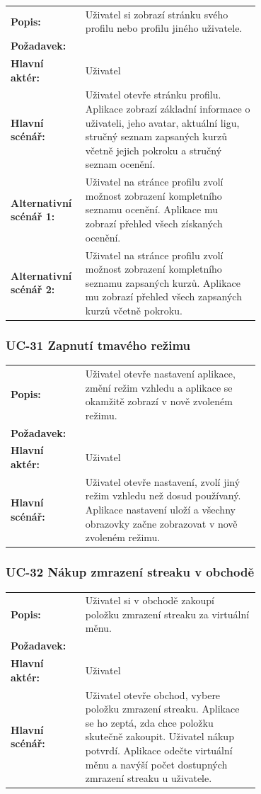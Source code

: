 \begin{tabular}{lp{0.7\linewidth}}
  \textbf{Popis:} & Uživatel si zobrazí stránku svého profilu nebo profilu jiného uživatele. \\
  \textbf{Požadavek:} & \nameref{sec:fp-user-profile} \\
  \textbf{Hlavní aktér:} & Uživatel \\
  \textbf{Hlavní scénář:} & Uživatel otevře stránku profilu. Aplikace zobrazí základní informace o uživateli, jeho avatar, aktuální ligu, stručný seznam zapsaných kurzů včetně jejich pokroku a stručný seznam ocenění. \\
  \textbf{Alternativní scénář 1:} & Uživatel na stránce profilu zvolí možnost zobrazení kompletního seznamu ocenění. Aplikace mu zobrazí přehled všech získaných ocenění. \\
  \textbf{Alternativní scénář 2:} & Uživatel na stránce profilu zvolí možnost zobrazení kompletního seznamu zapsaných kurzů. Aplikace mu zobrazí přehled všech zapsaných kurzů včetně pokroku. \\
\end{tabular}

\subsubsection{UC-31 Zapnutí tmavého režimu}

\begin{tabular}{lp{0.7\linewidth}}
  \textbf{Popis:} & Uživatel otevře nastavení aplikace, změní režim vzhledu a aplikace se okamžitě zobrazí v nově zvoleném režimu. \\
  \textbf{Požadavek:} & \nameref{sec:fp-dark-mode} \\
  \textbf{Hlavní aktér:} & Uživatel \\
  \textbf{Hlavní scénář:} & Uživatel otevře nastavení, zvolí jiný režim vzhledu než dosud používaný. Aplikace nastavení uloží a všechny obrazovky začne zobrazovat v nově zvoleném režimu. \\
\end{tabular}

\subsubsection{UC-32 Nákup zmrazení streaku v obchodě}

\begin{tabular}{lp{0.7\linewidth}}
  \textbf{Popis:} & Uživatel si v obchodě zakoupí položku zmrazení streaku za virtuální měnu. \\
  \textbf{Požadavek:} & \nameref{sec:fp-streak-freeze} \\
  \textbf{Hlavní aktér:} & Uživatel \\
  \textbf{Hlavní scénář:} & Uživatel otevře obchod, vybere položku zmrazení streaku. Aplikace se ho zeptá, zda chce položku skutečně zakoupit. Uživatel nákup potvrdí. Aplikace odečte virtuální měnu a navýší počet dostupných zmrazení streaku u uživatele. \\
\end{tabular}

